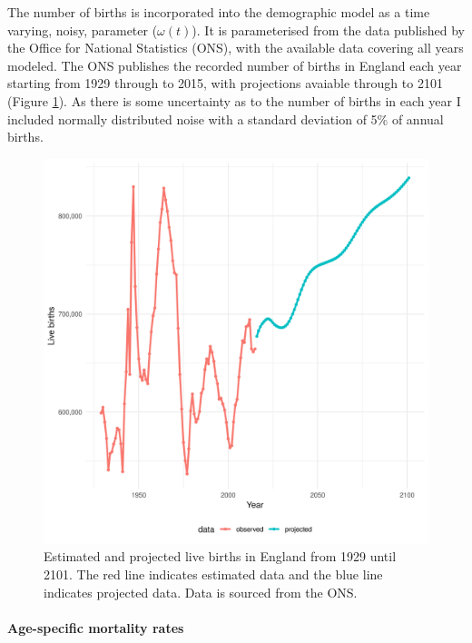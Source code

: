 \documentclass[11pt,twoside]{bristolthesis}
\begin{document}
  The number of births is incorporated into the demographic model as a time varying, noisy, parameter (\(\omega(t)\)). It is parameterised from the data published by the Office for National Statistics (ONS), with the available data covering all years modeled. The ONS publishes the recorded number of births in England each year starting from 1929 through to 2015, with projections avaiable through to 2101 (Figure \ref{fig:births-england}). As there is some uncertainty as to the number of births in each year I included normally distributed noise with a standard deviation of 5\% of annual births.
  \begin{figure}
  
  {\centering \includegraphics[width=0.8\linewidth,]{chapters/model-development/resources/figure/births} 
  
  }
  
  \caption[Estimated and projected live births in England from 1929 until 2101.]{Estimated and projected live births in England from 1929 until 2101. The red line indicates estimated data and the blue line indicates projected data. Data is sourced from the ONS.}\label{fig:births-england}
  \end{figure}
  \hypertarget{age-specific-mortality-rates}{%
  \paragraph{Age-specific mortality rates}\label{age-specific-mortality-rates}}
  
\end{document}
